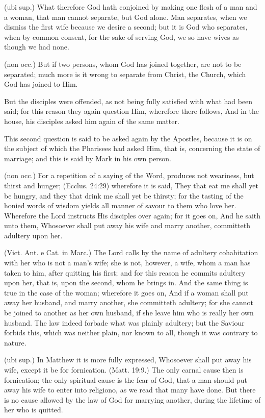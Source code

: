  (ubi sup.) What therefore God hath conjoined by making one flesh of a man and a woman, that man cannot separate, but God alone. Man separates, when we dismiss the first wife because we desire a second; but it is God who separates, when by common consent, for the sake of serving God, we so have wives as though we had none.

 (non occ.) But if two persons, whom God has joined together, are not to be separated; much more is it wrong to separate from Christ, the Church, which God has joined to Him.

 But the disciples were offended, as not being fully satisfied with what had been said; for this reason they again question Him, wherefore there follows, And in the house, his disciples asked him again of the same matter.

 This second question is said to be asked again by the Apostles, because it is on the subject of which the Pharisees had asked Him, that is, concerning the state of marriage; and this is said by Mark in his own person.

 (non occ.) For a repetition of a saying of the Word, produces not weariness, but thirst and hunger; (Ecclus. 24:29) wherefore it is said, They that eat me shall yet be hungry, and they that drink me shall yet be thirsty; for the tasting of the honied words of wisdom yields all manner of savour to them who love her. Wherefore the Lord instructs His disciples over again; for it goes on, And he saith unto them, Whosoever shall put away his wife and marry another, committeth adultery upon her.

 (Vict. Ant. e Cat. in Marc.) The Lord calls by the name of adultery cohabitation with her who is not a man’s wife; she is not, however, a wife, whom a man has taken to him, after quitting his first; and for this reason he commits adultery upon her, that is, upon the second, whom he brings in. And the same thing is true in the case of the woman; wherefore it goes on, And if a woman shall put away her husband, and marry another, she committeth adultery; for she cannot be joined to another as her own husband, if she leave him who is really her own husband. The law indeed forbade what was plainly adultery; but the Saviour forbids this, which was neither plain, nor known to all, though it was contrary to nature.

 (ubi sup.) In Matthew it is more fully expressed, Whosoever shall put away his wife, except it be for fornication. (Matt. 19:9.) The only carnal cause then is fornication; the only spiritual cause is the fear of God, that a man should put away his wife to enter into religiono, as we read that many have done. But there is no cause allowed by the law of God for marrying another, during the lifetime of her who is quitted.

